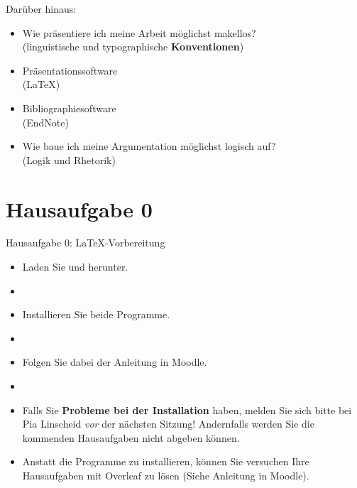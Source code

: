 \begin{frame}

Darüber hinaus:

\begin{itemize}
	
	\item<2-> Wie präsentiere ich meine Arbeit möglichst makellos?\\
	(\ras linguistische und typographische \textbf{Konventionen})
	
	\item<3-> Präsentationssoftware\\
	(\ras \LaTeX )
	 
	\item<4-> Bibliographiesoftware\\
	(\ras EndNote)
	
	\item<5-> Wie baue ich meine Argumentation möglichst logisch auf?\\
	(\ras Logik und Rhetorik)

\end{itemize}			
\end{frame}


\section{Hausaufgabe 0}

\begin{frame}{Hausaufgabe 0: \LaTeX -Vorbereitung}

\begin{itemize}
	\item Laden Sie  und   herunter.
	\item[]
	
	\item Installieren Sie beide Programme.
	\item[]
	
	\item Folgen Sie dabei der Anleitung in Moodle.
	\item[]
	
	\item Falls Sie \textbf{Probleme bei der Installation} haben, melden Sie sich bitte bei Pia Linscheid \emph{vor} der nächsten Sitzung! Andernfalls werden Sie die kommenden Hausaufgaben nicht abgeben können.
	
	\item Anstatt die Programme zu installieren, können Sie versuchen Ihre Hausaufgaben mit Overleaf zu lösen (Siehe Anleitung in Moodle).
\end{itemize}

\end{frame}


